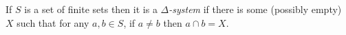 \documentclass[12pt]{article}
\begin{document}
If $S$ is a set of finite sets then it is a \emph{$\Delta$-system} if there is some (possibly empty) $X$ such that for any $a,b\in S$, if $a\neq b$ then $a\cap b=X$.
\end{document}
